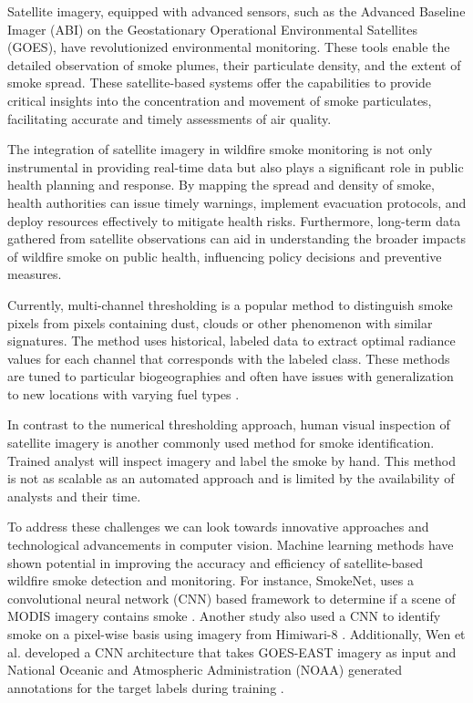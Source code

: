 \documentclass{article}
\begin{document}
Satellite imagery, equipped with advanced sensors, such as the Advanced Baseline Imager (ABI) on the Geostationary Operational Environmental Satellites (GOES), have revolutionized environmental monitoring. These tools enable the detailed observation of smoke plumes, their particulate density, and the extent of smoke spread. These satellite-based systems offer the capabilities to provide critical insights into the concentration and movement of smoke particulates, facilitating accurate and timely assessments of air quality.

The integration of satellite imagery in wildfire smoke monitoring is not only instrumental in providing real-time data but also plays a significant role in public health planning and response. By mapping the spread and density of smoke, health authorities can issue timely warnings, implement evacuation protocols, and deploy resources effectively to mitigate health risks. Furthermore, long-term data gathered from satellite observations can aid in understanding the broader impacts of wildfire smoke on public health, influencing policy decisions and preventive measures.

Currently, multi-channel thresholding is a popular method to distinguish smoke pixels from pixels containing dust, clouds or other phenomenon with similar signatures. The method uses historical, labeled data to extract optimal radiance values for each channel that corresponds with the labeled class. These methods are tuned to particular biogeographies and often have issues with generalization to new locations with varying fuel types \cite{thresh_geog}.

In contrast to the numerical thresholding approach, human visual inspection of satellite imagery is another commonly used method for smoke identification. Trained analyst will inspect imagery and label the smoke by hand. This method is not as scalable as an automated approach and is limited by the availability of analysts and their time.

To address these challenges we can look towards innovative approaches and technological advancements in computer vision. Machine learning methods have shown potential in improving the accuracy and efficiency of satellite-based wildfire smoke detection and monitoring. For instance, SmokeNet, uses a convolutional neural network (CNN) based framework to determine if a scene of MODIS imagery contains smoke \cite{smokenet}. Another study also used a CNN to identify smoke on a pixel-wise basis using imagery from Himiwari-8 \cite{larsen}. Additionally, Wen et al. developed a CNN architecture that takes GOES-EAST imagery as input and National Oceanic and Atmospheric Administration (NOAA) generated annotations for the target labels during training \cite{smoke_goes}. 
\end{document}
